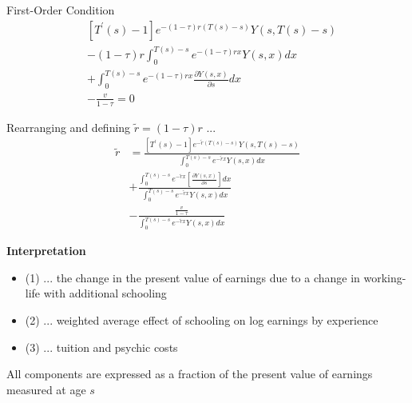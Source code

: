 \begin{frame}
First-Order Condition
\begin{align*}
& [T^\prime(s) - 1]e^{-(1 - \tau)r(T(s) - s)} Y(s, T(s) - s) \\
& - (1 - \tau)r\int^{T(s) - s}_0 e^{-(1 - \tau)rx} Y(s, x)dx \\
& + \int_0^{T(s) - s} e^{-(1 - \tau) rx} \frac{\partial Y(s, x)}{\partial s}dx \\
& - \frac{v}{ 1  -\tau} = 0
\end{align*}
\end{frame}
\begin{frame}
Rearranging and defining $\tilde{r} = (1 - \tau)r$ ...
\begin{align}
\tilde{r} & = \frac{[T^\prime(s) - 1]e^{-\tilde{r}(T(s) - s)}Y(s, T(s) - s )}{\int_0^{T(s) - s} e^{-\tilde{r}x}Y(s, x) dx} \\
          & + \frac{\int_0^{T(s) - s}e^{-\tilde{r}x}\left[\frac{\partial Y(s, x)}{\partial s}\right] dx}{\int_0^{T(s) - s}e^{-\tilde{r}x}Y(s, x) dx} \\
          & - \frac{\frac{v}{1-\tau}}{\int_0^{T(s) - s}e^{-\tilde{r}x}Y(s, x)dx}
\end{align}
\end{frame}
\begin{frame}\textbf{Interpretation}\vspace{0.3cm}
\begin{itemize}\setlength\itemsep{1em}
\item (1) ... the change in the present value of earnings due to a change in working-life with additional schooling
\item (2) ... weighted average effect of schooling on log earnings by experience
\item (3) ... tuition and psychic costs\vspace{0.3cm}
\end{itemize}

All components are expressed as a fraction of the present value of earnings measured at age $s$
\end{frame}
